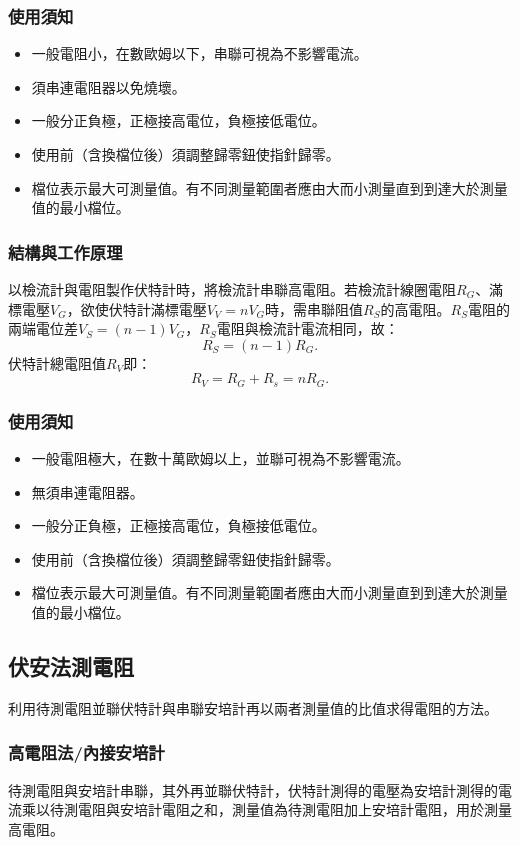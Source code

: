 \documentclass[a4paper,12pt]{report}
\begin{document}
\begin{itemize}
\subsubsection{使用須知}
\begin{itemize}
\item 一般電阻小，在數歐姆以下，串聯可視為不影響電流。
\item 須串連電阻器以免燒壞。
\item 一般分正負極，正極接高電位，負極接低電位。
\item 使用前（含換檔位後）須調整歸零鈕使指針歸零。
\item 檔位表示最大可測量值。有不同測量範圍者應由大而小測量直到到達大於測量值的最小檔位。
\end{itemize}
\subsubsection{結構與工作原理}
以檢流計與電阻製作伏特計時，將檢流計串聯高電阻。若檢流計線圈電阻$R_G$、滿標電壓$V_G$，欲使伏特計滿標電壓$V_V=nV_G$時，需串聯阻值$R_S$的高電阻。$R_S$電阻的兩端電位差$V_S=(n-1)V_G$，$R_S$電阻與檢流計電流相同，故：
\[R_S=(n-1)R_G.\]
伏特計總電阻值$R_V$即：
\[R_V=R_G+R_s=nR_G.\]
\subsubsection{使用須知}
\begin{itemize}
\item 一般電阻極大，在數十萬歐姆以上，並聯可視為不影響電流。
\item 無須串連電阻器。
\item 一般分正負極，正極接高電位，負極接低電位。
\item 使用前（含換檔位後）須調整歸零鈕使指針歸零。
\item 檔位表示最大可測量值。有不同測量範圍者應由大而小測量直到到達大於測量值的最小檔位。
\end{itemize}
\subsection{伏安法測電阻}
利用待測電阻並聯伏特計與串聯安培計再以兩者測量值的比值求得電阻的方法。
\subsubsection{高電阻法/內接安培計}
待測電阻與安培計串聯，其外再並聯伏特計，伏特計測得的電壓為安培計測得的電流乘以待測電阻與安培計電阻之和，測量值為待測電阻加上安培計電阻，用於測量高電阻。

\end{itemize}
\end{document}
